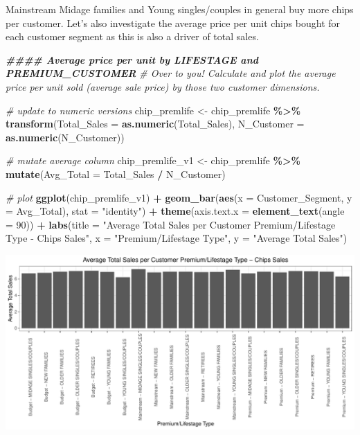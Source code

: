 \documentclass[
]{article}
\newenvironment{Shaded}{\begin{snugshade}}{\end{snugshade}}
\newcommand{\AttributeTok}[1]{\textcolor[rgb]{0.13,0.29,0.53}{#1}}
\newcommand{\CommentTok}[1]{\textcolor[rgb]{0.56,0.35,0.01}{\textit{#1}}}
\newcommand{\DecValTok}[1]{\textcolor[rgb]{0.00,0.00,0.81}{#1}}
\newcommand{\DocumentationTok}[1]{\textcolor[rgb]{0.56,0.35,0.01}{\textbf{\textit{#1}}}}
\newcommand{\FunctionTok}[1]{\textcolor[rgb]{0.13,0.29,0.53}{\textbf{#1}}}
\newcommand{\NormalTok}[1]{#1}
\newcommand{\OtherTok}[1]{\textcolor[rgb]{0.56,0.35,0.01}{#1}}
\newcommand{\SpecialCharTok}[1]{\textcolor[rgb]{0.81,0.36,0.00}{\textbf{#1}}}
\newcommand{\StringTok}[1]{\textcolor[rgb]{0.31,0.60,0.02}{#1}}
\begin{document}
Mainstream Midage families and Young singles/couples in general buy more
chips per customer. Let's also investigate the average price per unit
chips bought for each customer segment as this is also a driver of total
sales.

\begin{Shaded}
\begin{Highlighting}[]
\DocumentationTok{\#\#\#\# Average price per unit by LIFESTAGE and PREMIUM\_CUSTOMER}
\CommentTok{\# Over to you! Calculate and plot the average price per unit sold (average sale price) by those two customer dimensions.}

\CommentTok{\# update to numeric versions}
\NormalTok{chip\_premlife }\OtherTok{\textless{}{-}}\NormalTok{ chip\_premlife }\SpecialCharTok{\%\textgreater{}\%} \FunctionTok{transform}\NormalTok{(}\AttributeTok{Total\_Sales =} \FunctionTok{as.numeric}\NormalTok{(Total\_Sales), }\AttributeTok{N\_Customer =} \FunctionTok{as.numeric}\NormalTok{(N\_Customer))}

\CommentTok{\# mutate average column}
\NormalTok{chip\_premlife\_v1 }\OtherTok{\textless{}{-}}\NormalTok{ chip\_premlife }\SpecialCharTok{\%\textgreater{}\%} \FunctionTok{mutate}\NormalTok{(}\AttributeTok{Avg\_Total =}\NormalTok{ Total\_Sales }\SpecialCharTok{/}\NormalTok{ N\_Customer)}

\CommentTok{\# plot}
\FunctionTok{ggplot}\NormalTok{(chip\_premlife\_v1) }\SpecialCharTok{+} \FunctionTok{geom\_bar}\NormalTok{(}\FunctionTok{aes}\NormalTok{(}\AttributeTok{x =}\NormalTok{ Customer\_Segment, }\AttributeTok{y =}\NormalTok{ Avg\_Total), }\AttributeTok{stat =} \StringTok{"identity"}\NormalTok{) }\SpecialCharTok{+} \FunctionTok{theme}\NormalTok{(}\AttributeTok{axis.text.x =} \FunctionTok{element\_text}\NormalTok{(}\AttributeTok{angle =} \DecValTok{90}\NormalTok{)) }\SpecialCharTok{+} \FunctionTok{labs}\NormalTok{(}\AttributeTok{title =} \StringTok{"Average Total Sales per Customer Premium/Lifestage Type {-} Chips Sales"}\NormalTok{, }\AttributeTok{x =} \StringTok{"Premium/Lifestage Type"}\NormalTok{, }\AttributeTok{y =} \StringTok{"Average Total Sales"}\NormalTok{)}
\end{Highlighting}
\end{Shaded}

\begin{center}\includegraphics{template_files/figure-latex/unnamed-chunk-14-1} \end{center}
\end{document}
